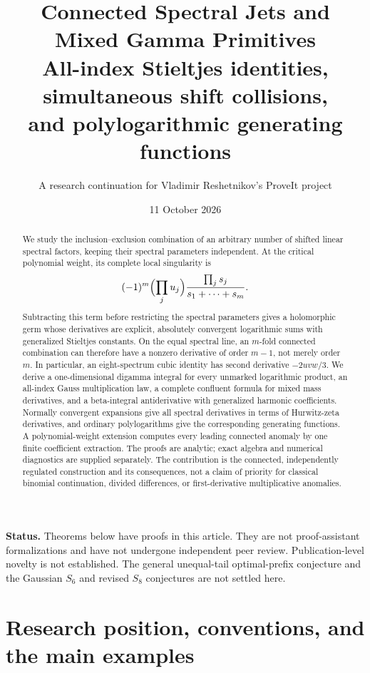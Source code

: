 \documentclass[11pt]{article}
\title{Connected Spectral Jets and Mixed Gamma Primitives\\[4pt]\large All-index Stieltjes identities, simultaneous shift collisions,\\and polylogarithmic generating functions}
\author{A research continuation for Vladimir Reshetnikov's ProveIt project}
\date{11 October 2026}
\numberwithin{equation}{section}
\theoremstyle{definition}\newtheorem{definition}[theorem]{Definition}
\theoremstyle{remark}\newtheorem{remark}[theorem]{Remark}
\begin{document}
\maketitle
\begin{abstract}
We study the inclusion--exclusion combination of an arbitrary number of shifted linear spectral factors, keeping their spectral parameters independent. At the critical polynomial weight, its complete local singularity is
\[
 (-1)^m\Bigl(\prod_j u_j\Bigr)\frac{\prod_j s_j}{s_1+\cdots+s_m}.
\]
Subtracting this term before restricting the spectral parameters gives a holomorphic germ whose derivatives are explicit, absolutely convergent logarithmic sums with generalized Stieltjes constants. On the equal spectral line, an $m$-fold connected combination can therefore have a nonzero derivative of order $m-1$, not merely order $m$. In particular, an eight-spectrum cubic identity has second derivative $-2uvw/3$.
We derive a one-dimensional digamma integral for every unmarked logarithmic product, an all-index Gauss multiplication law, a complete confluent formula for mixed mass derivatives, and a beta-integral antiderivative with generalized harmonic coefficients. Normally convergent expansions give all spectral derivatives in terms of Hurwitz-zeta derivatives, and ordinary polylogarithms give the corresponding generating functions. A polynomial-weight extension computes every leading connected anomaly by one finite coefficient extraction.
The proofs are analytic; exact algebra and numerical diagnostics are supplied separately. The contribution is the connected, independently regulated construction and its consequences, not a claim of priority for classical binomial continuation, divided differences, or first-derivative multiplicative anomalies.
\end{abstract}
\vspace{3pt}
\noindent\textbf{Status.} Theorems below have proofs in this article. They are not proof-assistant formalizations and have not undergone independent peer review. Publication-level novelty is not established. The general unequal-tail optimal-prefix conjecture and the Gaussian $S_6$ and revised $S_8$ conjectures are not settled here.
\newpage
\tableofcontents
\newpage

\section{Research position, conventions, and the main examples}
\end{document}
